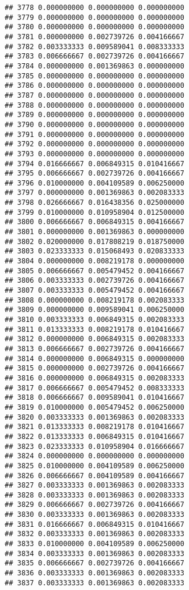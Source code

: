 \documentclass[
]{article}
\begin{document}
\begin{verbatim}
## 3778 0.000000000 0.000000000 0.000000000
## 3779 0.000000000 0.000000000 0.000000000
## 3780 0.000000000 0.000000000 0.000000000
## 3781 0.000000000 0.002739726 0.004166667
## 3782 0.003333333 0.009589041 0.008333333
## 3783 0.006666667 0.002739726 0.004166667
## 3784 0.000000000 0.001369863 0.000000000
## 3785 0.000000000 0.000000000 0.000000000
## 3786 0.000000000 0.000000000 0.000000000
## 3787 0.000000000 0.000000000 0.000000000
## 3788 0.000000000 0.000000000 0.000000000
## 3789 0.000000000 0.000000000 0.000000000
## 3790 0.000000000 0.000000000 0.000000000
## 3791 0.000000000 0.000000000 0.000000000
## 3792 0.000000000 0.000000000 0.000000000
## 3793 0.000000000 0.000000000 0.000000000
## 3794 0.016666667 0.006849315 0.010416667
## 3795 0.006666667 0.002739726 0.004166667
## 3796 0.010000000 0.004109589 0.006250000
## 3797 0.000000000 0.001369863 0.002083333
## 3798 0.026666667 0.016438356 0.025000000
## 3799 0.010000000 0.010958904 0.012500000
## 3800 0.006666667 0.006849315 0.004166667
## 3801 0.000000000 0.001369863 0.000000000
## 3802 0.020000000 0.017808219 0.018750000
## 3803 0.023333333 0.015068493 0.020833333
## 3804 0.000000000 0.008219178 0.000000000
## 3805 0.006666667 0.005479452 0.004166667
## 3806 0.003333333 0.002739726 0.004166667
## 3807 0.003333333 0.005479452 0.004166667
## 3808 0.000000000 0.008219178 0.002083333
## 3809 0.000000000 0.009589041 0.006250000
## 3810 0.003333333 0.006849315 0.002083333
## 3811 0.013333333 0.008219178 0.010416667
## 3812 0.000000000 0.006849315 0.002083333
## 3813 0.006666667 0.002739726 0.004166667
## 3814 0.000000000 0.006849315 0.000000000
## 3815 0.000000000 0.002739726 0.004166667
## 3816 0.000000000 0.006849315 0.002083333
## 3817 0.006666667 0.005479452 0.008333333
## 3818 0.006666667 0.009589041 0.010416667
## 3819 0.010000000 0.005479452 0.006250000
## 3820 0.003333333 0.001369863 0.002083333
## 3821 0.013333333 0.008219178 0.010416667
## 3822 0.013333333 0.006849315 0.010416667
## 3823 0.023333333 0.010958904 0.016666667
## 3824 0.000000000 0.000000000 0.000000000
## 3825 0.010000000 0.004109589 0.006250000
## 3826 0.006666667 0.004109589 0.004166667
## 3827 0.003333333 0.001369863 0.002083333
## 3828 0.003333333 0.001369863 0.002083333
## 3829 0.006666667 0.002739726 0.004166667
## 3830 0.003333333 0.001369863 0.002083333
## 3831 0.016666667 0.006849315 0.010416667
## 3832 0.003333333 0.001369863 0.002083333
## 3833 0.010000000 0.004109589 0.006250000
## 3834 0.003333333 0.001369863 0.002083333
## 3835 0.006666667 0.002739726 0.004166667
## 3836 0.003333333 0.001369863 0.002083333
## 3837 0.003333333 0.001369863 0.002083333

\end{verbatim}
\end{document}
